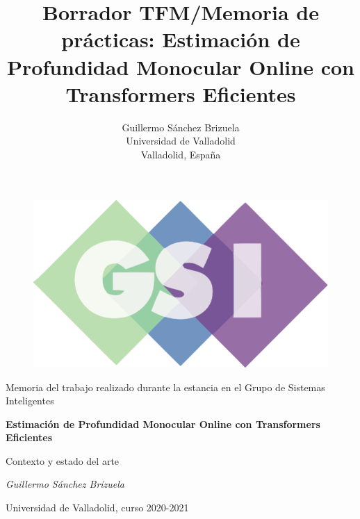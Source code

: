 \documentclass[a4paper]{article}
\title{Borrador TFM/Memoria de prácticas: Estimación de Profundidad Monocular Online con Transformers Eficientes}
\author{Guillermo Sánchez Brizuela\\
  \small Universidad de Valladolid\\
  \small Valladolid, España
  \date{}
}
\begin{document}
\begin{titlepage}
\centering
\begin{figure}[t]
	\centering
	\includegraphics[scale=0.35]{imagenes/gsi.png}
    \vspace{0.5cm}
\end{figure}%
	{\LARGE Memoria del trabajo realizado durante la estancia en el Grupo de Sistemas Inteligentes\par}
	\vspace{3cm}
	{\huge\bfseries Estimación de Profundidad Monocular Online con Transformers Eficientes\par}
	\vspace{0.5cm}
    {\LARGE Contexto y estado del arte\par}
    \vspace{3cm}
	{\Large\itshape Guillermo Sánchez Brizuela\par}
	\vspace{0.5cm}
	{\Large Universidad de Valladolid, curso 2020-2021\par}
	\vfill
\end{titlepage}


{
    \setcounter{tocdepth}{4}
    \setcounter{secnumdepth}{4}
    \hypersetup{linkcolor=black}
    \tableofcontents
}

\newpage


\end{document}

